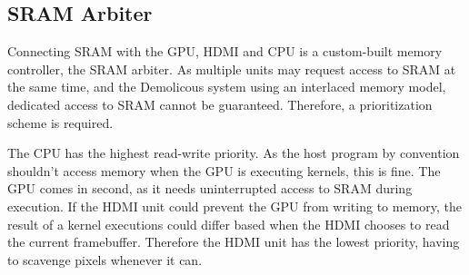 \subsection{SRAM Arbiter}

Connecting SRAM with the GPU, HDMI and CPU is a custom-built memory controller, the SRAM arbiter.
As multiple units may request access to SRAM at the same time, and the Demolicous system using an interlaced memory model,
dedicated access to SRAM cannot be guaranteed.
Therefore, a prioritization scheme is required.

The CPU has the highest read-write priority.
As the host program by convention shouldn't access memory when the GPU is executing kernels, this is fine.
The GPU comes in second, as it needs uninterrupted access to SRAM during execution.
If the HDMI unit could prevent the GPU from writing to memory,
the result of a kernel executions could differ based when the HDMI chooses to read the current framebuffer.
Therefore the HDMI unit has the lowest priority, having to scavenge pixels whenever it can.
